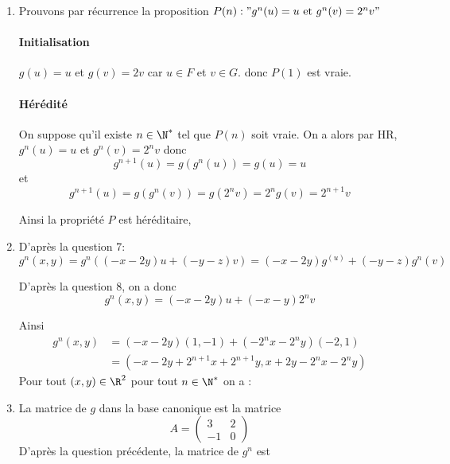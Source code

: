 \begin{correction}
\begin{enumerate}

\item 
Prouvons par récurrence la proposition  $P(n):"g^n(u)  =u \text{ et } g^n (v) = 2^n v"$

\paragraph{Initialisation }
$g(u)= u$ et $ g(v) =2v$ car $u\in F$ et $v\in G$. donc $P(1) $ est vraie. 

\paragraph{Hérédité}
On suppose qu'il existe $n\in \N^*$ tel que $P(n)$ soit vraie. On a alors par HR, 
$g^n(u) = u$ et $g^n(v) =2^n v$ donc 
$$g^{n+1} (u) =g (g^n(u)) = g(u) =u$$
et $$g^{n+1} (u) =g (g^n(v)) = g(2^nv) =2^n g(v) = 2^{n+1} v$$

Ainsi la propriété $P$ est héréditaire, 

\item 
D'après la question  7: 
$$g^n (x,y) = g^n((-x-2y)u + (-y-z) v) = (-x-2y) g^(u) +(-y-z)g^n (v)$$

D'après la question 8, on a donc 
$$g^n (x,y) = (-x-2y) u + (-x-y) 2^n v$$

Ainsi 
\begin{align*}
g^n (x,y) &= (-x-2y) (1,-1) + (-2^n x -2^n y) (-2,1)\\
				&=( -x-2y +2^{n+1} x +2^{n+1} y , x+2y -2^n x-2^n y)
\end{align*}
Pour tout $(x,y) \in \R^2$ pour tout $n\in \N^* $ on a : 

\item 
La matrice de $g$ dans la base canonique est la matrice 
$$A =\begin{pmatrix}
3 & 2\\
-1 & 0
\end{pmatrix}$$
D'après la question précédente, la matrice de $g^n$ est 






\end{enumerate}
\end{correction}
